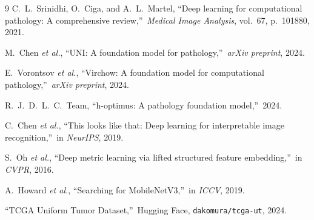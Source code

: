 \documentclass[11pt,twocolumn]{article}
\begin{document}
\begin{thebibliography}{9}
C.~L.~Srinidhi, O.~Ciga, and A.~L.~Martel, ``Deep learning for computational pathology: A comprehensive review,''\ \textit{Medical Image Analysis}, vol.~67, p.~101880, 2021.

M.~Chen \textit{et al.}, ``UNI: A foundation model for pathology,''\ \textit{arXiv preprint}, 2024.

E.~Vorontsov \textit{et al.}, ``Virchow: A foundation model for computational pathology,''\ \textit{arXiv preprint}, 2024.

R.~J.~D.~L.~C.~Team, ``h-optimus: A pathology foundation model,''\ 2024.

C.~Chen \textit{et al.}, ``This looks like that: Deep learning for interpretable image recognition,''\ in \textit{NeurIPS}, 2019.

S.~Oh \textit{et al.}, ``Deep metric learning via lifted structured feature embedding,''\ in \textit{CVPR}, 2016.

A.~Howard \textit{et al.}, ``Searching for MobileNetV3,''\ in \textit{ICCV}, 2019.

``TCGA Uniform Tumor Dataset,''\ Hugging Face, \texttt{dakomura/tcga-ut}, 2024.
\end{thebibliography}
\end{document}
